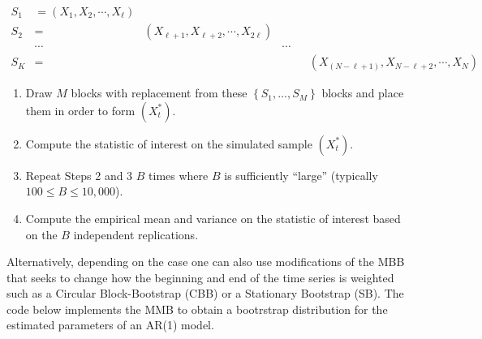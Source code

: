 \documentclass[]{book}
\providecommand{\tightlist}{%
  \setlength{\itemsep}{0pt}\setlength{\parskip}{0pt}}
\theoremstyle{definition}
\theoremstyle{definition}
\theoremstyle{definition}
\theoremstyle{remark}
\begin{document}
\[\begin{aligned}
  {S_1}& =  ({X_1}, {X_2}, \cdots , {X_\ell})& & && \\
  {S_2}& =  &( {X_{\ell+1}}, {X_{\ell+2}}, \cdots , {X_{2\ell}}) & && \\
  & \cdots  & {} & \cdots && \\
  {S_K} & =  & & {} &&( {X_{\left({N-\ell+1}\right)}}, {X_{N-\ell+2}}, \cdots , {X_{N}})
  \end{aligned}\]

\begin{enumerate}
\def\labelenumi{\arabic{enumi}.}
\setcounter{enumi}{1}
\tightlist
\item
  Draw \(M\) blocks with replacement from these
  \(\left\{S_1, \ldots, S_M\right\}\) blocks and place them in order to
  form \((X_t^*)\).
\item
  Compute the statistic of interest on the simulated sample \((X_t^*)\).
\item
  Repeat Steps 2 and 3 \(B\) times where \(B\) is sufficiently ``large''
  (typically \(100 \leq B \leq 10,000\)).
\item
  Compute the empirical mean and variance on the statistic of interest
  based on the \(B\) independent replications.

\end{enumerate}

Alternatively, depending on the case one can also use modifications of
the MBB that seeks to change how the beginning and end of the time
series is weighted such as a Circular Block-Bootstrap (CBB) or a
Stationary Bootstrap (SB). The code below implements the MMB to obtain a
bootrstrap distribution for the estimated parameters of an AR(1) model.
\end{document}
